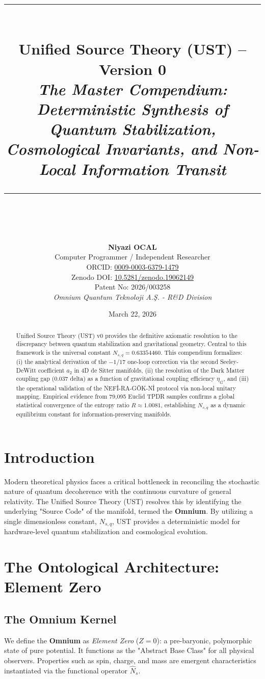 \documentclass[11pt,a4paper]{article}
\title{
    \rule{\linewidth}{0.5mm} \\ [0.4cm]
    \textbf{\huge Unified Source Theory (UST) -- Version 0} \\
    \Large \textit{The Master Compendium: Deterministic Synthesis of Quantum Stabilization, Cosmological Invariants, and Non-Local Information Transit} \\
    \rule{\linewidth}{0.5mm} \\ [0.8cm]
}
\author{
    \textbf{Niyazi OCAL} \\
    \small Computer Programmer / Independent Researcher \\
    \small ORCID: \href{https://orcid.org/0009-0003-6379-1479}{0009-0003-6379-1479} \\
    \small Zenodo DOI: \href{https://doi.org/10.5281/zenodo.19062149}{10.5281/zenodo.19062149} \\
    \small Patent No: 2026/003258 \\ [0.5cm]
    \small \textit{Omnium Quantum Teknoloji A.Ş. - R\&D Division}
}
\date{March 22, 2026}
\newcommand{\nsq}{N_{s,q}}
\begin{document}
\maketitle

\begin{abstract}
Unified Source Theory (UST) v0 provides the definitive axiomatic resolution to the discrepancy between quantum stabilization and gravitational geometry. Central to this framework is the universal constant $\nsq = 0.63354460$. This compendium formalizes: (i) the analytical derivation of the $-1/17$ one-loop correction via the second Seeley-DeWitt coefficient $a_2$ in 4D de Sitter manifolds, (ii) the resolution of the Dark Matter coupling gap ($0.037$ delta) as a function of gravitational coupling efficiency $\eta_G$, and (iii) the operational validation of the NEFİ-RA-GÖK-Nİ protocol via non-local unitary mapping. Empirical evidence from 79,095 Euclid TPDR samples confirms a global statistical convergence of the entropy ratio $R \approx 1.0081$, establishing $\nsq$ as a dynamic equilibrium constant for information-preserving manifolds.
\end{abstract}

\tableofcontents
\newpage

\section{Introduction}
Modern theoretical physics faces a critical bottleneck in reconciling the stochastic nature of quantum decoherence with the continuous curvature of general relativity. The Unified Source Theory (UST) resolves this by identifying the underlying "Source Code" of the manifold, termed the \textbf{Omnium}. By utilizing a single dimensionless constant, $\nsq$, UST provides a deterministic model for hardware-level quantum stabilization and cosmological evolution.

\section{The Ontological Architecture: Element Zero}
\subsection{The Omnium Kernel}
We define the \textbf{Omnium} as \textit{Element Zero} ($Z=0$): a pre-baryonic, polymorphic state of pure potential. It functions as the "Abstract Base Class" for all physical observers. Properties such as spin, charge, and mass are emergent characteristics instantiated via the functional operator $\hat{N}_s$.
\end{document}
